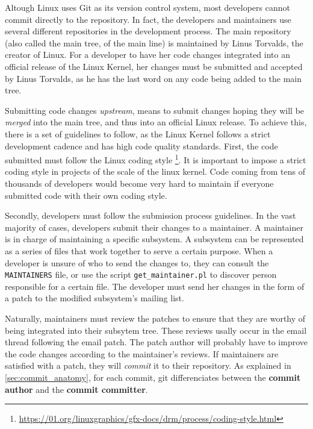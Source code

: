 \label{sec:Introduction}  
Altough Linux uses Git as its version control system, most developers cannot commit directly to the repository. In fact, the developers and maintainers use several different repositories in the development process. The main repository (also called the main tree, of the main line) is maintained by Linus Torvalds, the creator of Linux. For a developer to have her code changes integrated into an official release of the Linux Kernel, her changes must be submitted and accepted by Linus Torvalds, as he has the last word on any code being added to the main tree. 

Submitting code changes \textit{upstream}, means to submit changes hoping they will be \textit{merged} into the main tree, and thus into an official Linux release. To achieve this, there is a set of guidelines to follow, as the Linux Kernel follows a strict development cadence and has high code quality standards. First, the code submitted must follow the Linux coding style \footnote{\url{https://01.org/linuxgraphics/gfx-docs/drm/process/coding-style.html}}. It is important to impose a strict coding style in projects of the scale of the linux kernel. Code coming from tens of thousands of developers would become very hard to maintain if everyone submitted code with their own coding style. 

Secondly, developers must follow the submission process guidelines. In the vast majority of cases, developers submit their changes to a maintainer. A maintainer is in charge of maintaining a specific subsystem. A subsystem can be represented as a series of files that work together to serve a certain purpose. When a developer is unsure of who to send the changes to, they can consult the \texttt{MAINTAINERS} file, or use the script \texttt{get\_maintainer.pl} to discover person responsible for a certain file. The developer must send her changes in the form of a patch to the modified subsystem's mailing list. 

Naturally, maintainers must review the patches to ensure that they are worthy of being integrated into their subsytem tree. These reviews usally occur in the email thread following the email patch. The patch author will probably have to improve the code changes according to the maintainer's reviews. If maintainers are satisfied with a patch, they will \textit{commit} it to their repository. As explained in \autoref{sec:commit_anatomy}, for each commit, git differenciates between the \textbf{commit author} and the \textbf{commit committer}. 

